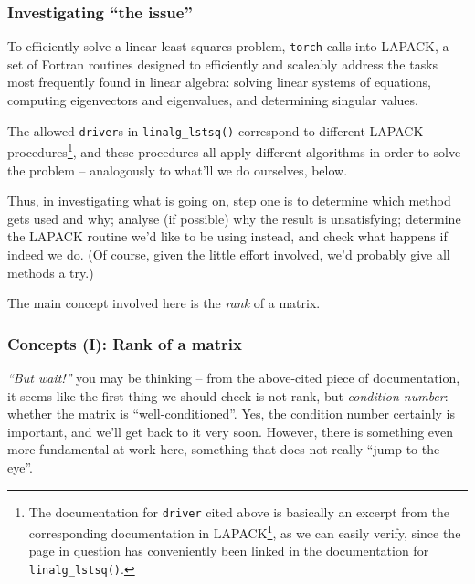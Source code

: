 \documentclass[
  letterpaper,
]{krantz}
\DeclareRobustCommand{\href}[2]{#2\footnote{\url{#1}}}
\begin{document}
\hypertarget{investigating-the-issue}{%
\subsubsection{Investigating ``the
issue''}\label{investigating-the-issue}}

To efficiently solve a linear least-squares problem, \texttt{torch}
calls into LAPACK, a set of Fortran routines designed to efficiently and
scaleably address the tasks most frequently found in linear algebra:
solving linear systems of equations, computing eigenvectors and
eigenvalues, and determining singular values.

The allowed \texttt{driver}s in \texttt{linalg\_lstsq()} correspond to
different LAPACK procedures\footnote{The documentation for
  \texttt{driver} cited above is basically an excerpt from the
  corresponding documentation in
  \href{https://www.netlib.org/lapack/lug/node27.html}{LAPACK}, as we
  can easily verify, since the page in question has conveniently been
  linked in the documentation for \texttt{linalg\_lstsq()}.}, and these
procedures all apply different algorithms in order to solve the problem
-- analogously to what'll we do ourselves, below.

Thus, in investigating what is going on, step one is to determine which
method gets used and why; analyse (if possible) why the result is
unsatisfying; determine the LAPACK routine we'd like to be using
instead, and check what happens if indeed we do. (Of course, given the
little effort involved, we'd probably give all methods a try.)

The main concept involved here is the \emph{rank} of a matrix.

\hypertarget{concepts-i-rank-of-a-matrix}{%
\subsubsection{\texorpdfstring{Concepts (I): Rank of a
matrix}{Concepts (I): Rank of a matrix}}\label{concepts-i-rank-of-a-matrix}}

\emph{``But wait!''} you may be thinking -- from the above-cited piece
of documentation, it seems like the first thing we should check is not
rank, but \emph{condition number}: whether the matrix is
``well-conditioned''. Yes, the condition number certainly is important,
and we'll get back to it very soon. However, there is something even
more fundamental at work here, something that does not really ``jump to
the eye''.
\end{document}
